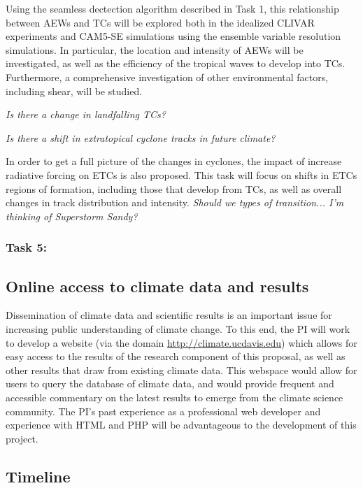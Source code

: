 \documentclass[11pt]{article}
\begin{document}
Using the seamless dectection algorithm described in Task 1, this relationship between AEWs and TCs will be explored both in the idealized CLIVAR experiments and CAM5-SE simulations using the ensemble variable resolution simulations. In particular, the location and intensity of AEWs will be investigated, as well as the efficiency of the tropical waves to develop into TCs. Furthermore, a comprehensive investigation of other environmental factors, including shear, will be studied.

\emph{Is there a change in landfalling TCs?}

\emph{Is there a shift in extratopical cyclone tracks in future climate?}

In order to get a full picture of the changes in cyclones, the impact of increase radiative forcing on ETCs is also proposed. This task will focus on shifts in ETCs regions of formation, including those that develop from TCs, as well as overall changes in track distribution and intensity. \emph{Should we types of transition... I'm thinking of Superstorm Sandy?}

\subsubsection{Task 5:}

\subsection{Online access to climate data and results}

Dissemination of climate data and scientific results is an important issue for increasing public understanding of climate change.  To this end, the PI will work to develop a website (via the domain \url{http://climate.ucdavis.edu}) which allows for easy access to the results of the research component of this proposal, as well as other results that draw from existing climate data.  This webspace would allow for users to query the database of climate data, and would provide frequent and accessible commentary on the latest results to emerge from the climate science community.  The PI's past experience as a professional web developer and experience with HTML and PHP will be advantageous to the development of this project.

\subsection{Timeline} \label{sec:Timeline}
\end{document}
